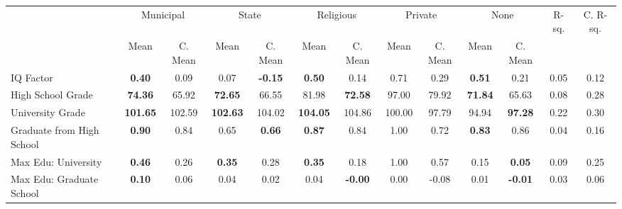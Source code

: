 \begin{tabular}{l c c c c c c c c c c c c}
\toprule
& \multicolumn{2}{c}{Municipal} & \multicolumn{2}{c}{State} & \multicolumn{2}{c}{Religious} & \multicolumn{2}{c}{Private} & \multicolumn{2}{c}{None} & R-sq. & C. R-sq. \\
& \scriptsize Mean & \scriptsize C. Mean & \scriptsize Mean & \scriptsize C. Mean & \scriptsize Mean & \scriptsize C. Mean & \scriptsize Mean & \scriptsize C. Mean & \scriptsize Mean & \scriptsize C. Mean & & \\
\midrule
IQ Factor & \textbf{     0.40} & 0.09 &      0.07 & \textbf{    -0.15} & \textbf{     0.50} & 0.14 &      0.71 & 0.29 & \textbf{     0.51} & 0.21 &      0.05 &      0.12 \\
High School Grade & \textbf{    74.36} & 65.92 & \textbf{    72.65} & 66.55 &     81.98 & \textbf{    72.58} &     97.00 & 79.92 & \textbf{    71.84} & 65.63 &      0.08 &      0.28 \\
University Grade & \textbf{   101.65} & 102.59 & \textbf{   102.63} & 104.02 & \textbf{   104.05} & 104.86 &    100.00 & 97.79 &     94.94 & \textbf{    97.28} &      0.22 &      0.30 \\
Graduate from High School & \textbf{     0.90} & 0.84 &      0.65 & \textbf{     0.66} & \textbf{     0.87} & 0.84 &      1.00 & 0.72 & \textbf{     0.83} & 0.86 &      0.04 &      0.16 \\
Max Edu: University & \textbf{     0.46} & 0.26 & \textbf{     0.35} & 0.28 & \textbf{     0.35} & 0.18 &      1.00 & 0.57 &      0.15 & \textbf{     0.05} &      0.09 &      0.25 \\
Max Edu: Graduate School & \textbf{     0.10} & 0.06 &      0.04 & 0.02 &      0.04 & \textbf{    -0.00} &      0.00 & -0.08 &      0.01 & \textbf{    -0.01} &      0.03 &      0.06 \\
\bottomrule
\end{tabular}
